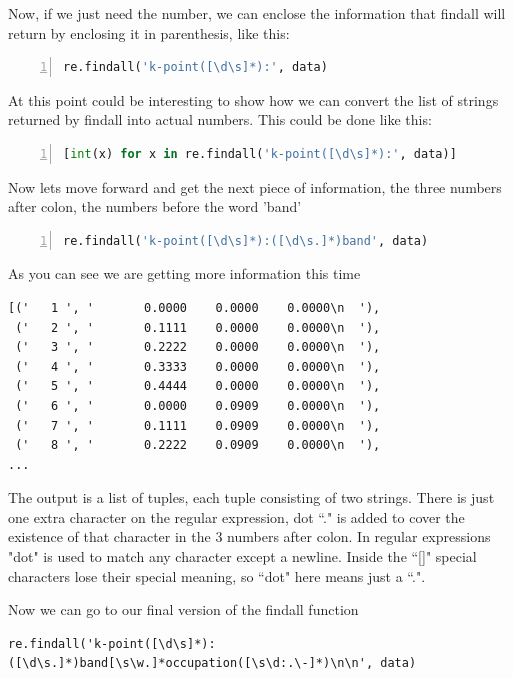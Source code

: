 Now, if we just need the number, we can enclose the information that findall will return by enclosing it in parenthesis, like this:

\begin{lstlisting}[language=Python, numbers=left]
re.findall('k-point([\d\s]*):', data)
\end{lstlisting}

At this point could be interesting to show how we can convert the list of strings returned by findall into actual numbers.
This could be done like this:

\begin{lstlisting}[language=Python, numbers=left]
[int(x) for x in re.findall('k-point([\d\s]*):', data)]
\end{lstlisting}

Now lets move forward and get the next piece of information, the three numbers after colon, the numbers before the word 'band'

\begin{lstlisting}[language=Python, numbers=left]
re.findall('k-point([\d\s]*):([\d\s.]*)band', data)
\end{lstlisting}

As you can see we are getting more information this time

\begin{lstlisting}
[('   1 ', '       0.0000    0.0000    0.0000\n  '),
 ('   2 ', '       0.1111    0.0000    0.0000\n  '),
 ('   3 ', '       0.2222    0.0000    0.0000\n  '),
 ('   4 ', '       0.3333    0.0000    0.0000\n  '),
 ('   5 ', '       0.4444    0.0000    0.0000\n  '),
 ('   6 ', '       0.0000    0.0909    0.0000\n  '),
 ('   7 ', '       0.1111    0.0909    0.0000\n  '),
 ('   8 ', '       0.2222    0.0909    0.0000\n  '),
...
\end{lstlisting}

The output is a list of tuples, each tuple consisting of two strings. There is just one extra character on the regular expression, dot ``." is added to cover the existence of that character in the 3 numbers after colon. In regular expressions "dot" is used to match any character except a newline. Inside the ``[]" special characters lose their special meaning, so ``dot" here means just a ``.".

Now we can go to our final version of the findall function

\begin{lstlisting}
re.findall('k-point([\d\s]*):([\d\s.]*)band[\s\w.]*occupation([\s\d:.\-]*)\n\n', data)
\end{lstlisting}

